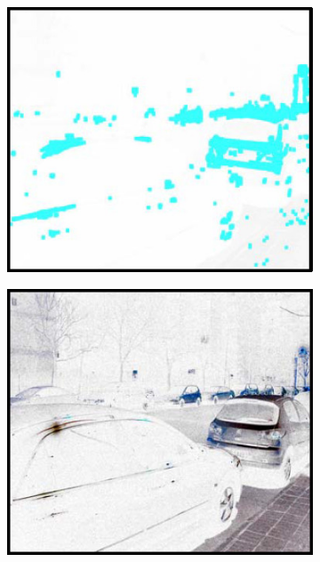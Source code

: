 \documentclass[a4paper]{ctexart}
\begin{document}
\begin{figure}[htbp]
\begin{subfigure}{0.18\textwidth}
			\captionsetup{font=scriptsize}
			\label{fig: Inversed}
		\end{subfigure}
		\begin{subfigure}{0.18\textwidth}
			\includegraphics[width=\linewidth]{picture/LLIE/Inverse/marked image}
			\captionsetup{font=scriptsize}
			\label{fig: marked image}	
		\end{subfigure}
		\begin{subfigure}{0.18\textwidth}
			\includegraphics[width=\linewidth]{picture/LLIE/Inverse/de-haze}

\end{subfigure}
\end{figure}
\end{document}
